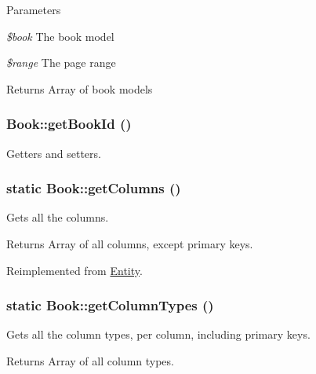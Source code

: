 \begin{DoxyParams}{Parameters}
\item[{\em \$book}]The book model \item[{\em \$range}]The page range \end{DoxyParams}
\begin{DoxyReturn}{Returns}
Array of book models 
\end{DoxyReturn}
\hypertarget{classBook_ac81f1151560d721510ddebc4b029cfcd}{
\subsubsection[{getBookId}]{\setlength{\rightskip}{0pt plus 5cm}Book::getBookId ()}}
\label{classBook_ac81f1151560d721510ddebc4b029cfcd}
Getters and setters. \hypertarget{classBook_a26e48647691c869f9de967b1e5e2e49d}{
\subsubsection[{getColumns}]{\setlength{\rightskip}{0pt plus 5cm}static Book::getColumns ()}}
\label{classBook_a26e48647691c869f9de967b1e5e2e49d}
Gets all the columns.

\begin{DoxyReturn}{Returns}
Array of all columns, except primary keys. 
\end{DoxyReturn}


Reimplemented from \hyperlink{classEntity_a394717a08ffd54ec9a14d06727c86719}{Entity}.

\hypertarget{classBook_afeabb3df0ca3af21d93d2c6d2be84fe6}{
\subsubsection[{getColumnTypes}]{\setlength{\rightskip}{0pt plus 5cm}static Book::getColumnTypes ()}}
\label{classBook_afeabb3df0ca3af21d93d2c6d2be84fe6}
Gets all the column types, per column, including primary keys.

\begin{DoxyReturn}{Returns}
Array of all column types. 
\end{DoxyReturn}


